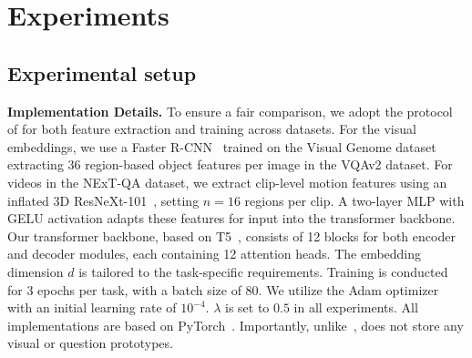 \section{Experiments}
\label{sec:experiments}

\subsection{Experimental setup}
\noindent\textbf{Implementation Details. }To ensure a fair comparison, we adopt the protocol of \citep{zhang2023vqacl} for both feature extraction and training across datasets. For the visual embeddings, we use a Faster R-CNN~\citep{faster_rcnn} trained on the Visual Genome dataset~\citep{Krishna2016VisualGC} extracting 36 region-based object features per image in the VQAv2 dataset. For videos in the NExT-QA dataset, we extract clip-level motion features using an inflated 3D ResNeXt-101~\citep{hara3dcnns}, setting $n = 16$ regions per clip. A two-layer MLP with GELU activation adapts these features for input into the transformer backbone. Our transformer backbone, based on T5~\citep{2020t5}, consists of 12 blocks for both encoder and decoder modules, each containing 12 attention heads. The embedding dimension $d$ is tailored to the task-specific requirements. Training is conducted for 3 epochs per task, with a batch size of 80. We utilize the Adam optimizer~\citep{KingBa15} with an initial learning rate of $10^{-4}$. $\lambda$ is set to $0.5$ in all experiments. All implementations are based on PyTorch~\citep{pytorch}. Importantly, unlike~\citep{zhang2023vqacl}, \qstmethodshort{} does not store any visual or question prototypes.


